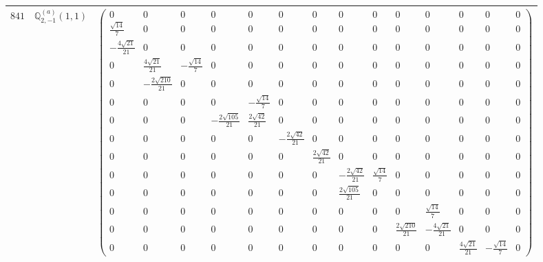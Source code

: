 \documentclass[fleqn,8pt,landscape]{jsarticle}
\begin{document}
\begin{center}
\begin{longtable}{ccc}
$ 841 $ & $ \mathbb{Q}_{2,-1}^{(a)}(1,1) $ & $ \begin{pmatrix} 0 & 0 & 0 & 0 & 0 & 0 & 0 & 0 & 0 & 0 & 0 & 0 & 0 & 0 \\ \frac{\sqrt{14}}{7} & 0 & 0 & 0 & 0 & 0 & 0 & 0 & 0 & 0 & 0 & 0 & 0 & 0 \\ - \frac{4 \sqrt{21}}{21} & 0 & 0 & 0 & 0 & 0 & 0 & 0 & 0 & 0 & 0 & 0 & 0 & 0 \\ 0 & \frac{4 \sqrt{21}}{21} & - \frac{\sqrt{14}}{7} & 0 & 0 & 0 & 0 & 0 & 0 & 0 & 0 & 0 & 0 & 0 \\ 0 & - \frac{2 \sqrt{210}}{21} & 0 & 0 & 0 & 0 & 0 & 0 & 0 & 0 & 0 & 0 & 0 & 0 \\ 0 & 0 & 0 & 0 & - \frac{\sqrt{14}}{7} & 0 & 0 & 0 & 0 & 0 & 0 & 0 & 0 & 0 \\ 0 & 0 & 0 & - \frac{2 \sqrt{105}}{21} & \frac{2 \sqrt{42}}{21} & 0 & 0 & 0 & 0 & 0 & 0 & 0 & 0 & 0 \\ 0 & 0 & 0 & 0 & 0 & - \frac{2 \sqrt{42}}{21} & 0 & 0 & 0 & 0 & 0 & 0 & 0 & 0 \\ 0 & 0 & 0 & 0 & 0 & 0 & \frac{2 \sqrt{42}}{21} & 0 & 0 & 0 & 0 & 0 & 0 & 0 \\ 0 & 0 & 0 & 0 & 0 & 0 & 0 & - \frac{2 \sqrt{42}}{21} & \frac{\sqrt{14}}{7} & 0 & 0 & 0 & 0 & 0 \\ 0 & 0 & 0 & 0 & 0 & 0 & 0 & \frac{2 \sqrt{105}}{21} & 0 & 0 & 0 & 0 & 0 & 0 \\ 0 & 0 & 0 & 0 & 0 & 0 & 0 & 0 & 0 & 0 & \frac{\sqrt{14}}{7} & 0 & 0 & 0 \\ 0 & 0 & 0 & 0 & 0 & 0 & 0 & 0 & 0 & \frac{2 \sqrt{210}}{21} & - \frac{4 \sqrt{21}}{21} & 0 & 0 & 0 \\ 0 & 0 & 0 & 0 & 0 & 0 & 0 & 0 & 0 & 0 & 0 & \frac{4 \sqrt{21}}{21} & - \frac{\sqrt{14}}{7} & 0 \end{pmatrix} $ \\ \hline

\end{longtable}
\end{center}
\end{document}
